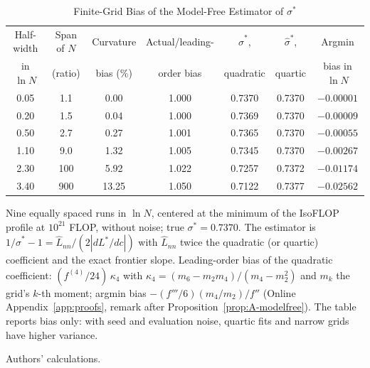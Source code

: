 \begin{table}[tp]
\centering
\caption{Finite-Grid Bias of the Model-Free Estimator of $\sigma^*$}
\label{tab:app-finite-grid}
\footnotesize
\setlength{\tabcolsep}{4pt}
\begin{tabular*}{\textwidth}{@{\extracolsep{\fill}}ccccccc@{}}
\toprule
Half-width & Span of $N$ & Curvature & Actual/leading- & $\hat\sigma^*$, & $\hat\sigma^*$, & Argmin \\
in $\ln N$ & (ratio) & bias (\%) & order bias & quadratic & quartic & bias in $\ln N$ \\
\midrule
0.05 & 1.1 & 0.00 & 1.000 & 0.7370 & 0.7370 & $-0.00001$ \\
0.20 & 1.5 & 0.04 & 1.000 & 0.7369 & 0.7370 & $-0.00009$ \\
0.50 & 2.7 & 0.27 & 1.001 & 0.7365 & 0.7370 & $-0.00055$ \\
1.10 & 9.0 & 1.32 & 1.005 & 0.7345 & 0.7370 & $-0.00267$ \\
2.30 & 100 & 5.92 & 1.022 & 0.7257 & 0.7372 & $-0.01174$ \\
3.40 & 900 & 13.25 & 1.050 & 0.7122 & 0.7377 & $-0.02562$ \\
\bottomrule
\end{tabular*}
\par\smallskip
\begin{tablenotes}
Nine equally spaced runs in $\ln N$, centered at the minimum of the \citet{besiroglu2024chinchilla} IsoFLOP profile at
$10^{21}$ FLOP, without noise; true $\sigma^*=0.7370$. The estimator is $1/\hat\sigma^*-1=\hat L_{nn}/(2|dL^*/dc|)$ with
$\hat L_{nn}$ twice the quadratic (or quartic) coefficient and the exact frontier slope. Leading-order bias of the
quadratic coefficient: $(f^{(4)}/24)\,\kappa_4$ with $\kappa_4=(m_6-m_2m_4)/(m_4-m_2^2)$ and $m_k$ the grid's $k$-th
moment; argmin bias $-(f'''/6)(m_4/m_2)/f''$ (Online Appendix~\ref{app:proofs}, remark after
Proposition~\ref{prop:A-modelfree}). The table reports bias only: with seed and evaluation noise, quartic fits and
narrow grids have higher variance.
\end{tablenotes}
\begin{tablenotes}[Source]
Authors' calculations.
\end{tablenotes}
\end{table}
